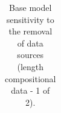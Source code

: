 \documentclass[
]{scrartcl}
\begin{document}
\begin{landscape}
\begin{longtable}[t]
\end{longtable}

\endgroup{}


\end{landscape}

\newpage{}

\begin{landscape}
\begingroup\fontsize{9}{11}\selectfont

\begin{longtable}[t]{ll>{\raggedright\arraybackslash}p{4em}>{\raggedright\arraybackslash}p{4em}>{\raggedright\arraybackslash}p{4em}>{\raggedright\arraybackslash}p{4em}>{\raggedright\arraybackslash}p{4em}>{\raggedright\arraybackslash}p{4em}>{\raggedright\arraybackslash}p{4em}}

\caption{\label{tbl-sensitivities-like-comps-len1}Base model sensitivity
to the removal of data sources (length compositional data - 1 of 2).}

\tabularnewline


\end{longtable}
\end{landscape}
\end{document}
